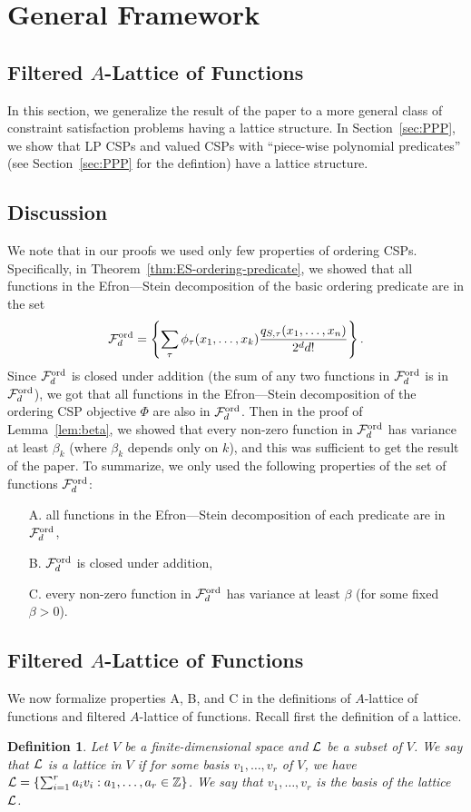 \documentclass[11pt]{article}
\newcommand {\set}   [1] {\left\{ #1 \right\}}
\newcommand {\bbZ}    {\mathbb{Z}}
\newcommand {\calF}   {{\cal{F}}}
\newcommand {\calL}   {{\cal{L}}}
\newtheorem{definition}[theorem]{Definition}
\begin{document}
\section{General Framework}\label{sec:general-framework}
\subsection{Filtered $A$-Lattice of Functions}
In this section, we generalize the result of the paper to a more general class of constraint satisfaction problems having a lattice structure. In Section~\ref{sec:PPP},
we show that LP CSPs and valued CSPs with ``piece-wise polynomial predicates'' (see Section~\ref{sec:PPP} for the defintion) have a lattice structure.

\subsection{Discussion}
We note that in our proofs we used only few properties of ordering CSPs. Specifically, in Theorem~\ref{thm:ES-ordering-predicate}, we showed that
all functions in the Efron---Stein decomposition of the basic ordering predicate are in the set
$$
\calF^{\mathrm{ord}}_{d} = \set{\sum_{\tau}\phi_{\tau}(x_1,\dots, x_k) \frac{q_{S,\tau}(x_1,\dots, x_n)}{2^{d} d!}}.
$$
Since $\calF^{\mathrm{ord}}_{d}$ is closed under addition (the sum of any two functions in $\calF^{\mathrm{ord}}_{d}$ is in $\calF^{\mathrm{ord}}_{d}$), we got that
all functions in the Efron---Stein decomposition of the ordering CSP objective $\Phi$ are also in $\calF^{\mathrm{ord}}_{d}$.
Then in the proof of  Lemma~\ref{lem:beta}, we showed that every non-zero function in $\calF^{\mathrm{ord}}_{d}$  has
variance at least $\beta_k$ (where $\beta_k$ depends only on $k$), and this was sufficient to get the result of the paper.
To summarize, we only used the following properties of the set of functions $\calF^{\mathrm{ord}}_{d}$:
\begin{itemize}
\item[A.] all functions in the Efron---Stein decomposition of each predicate are in $\calF^{\mathrm{ord}}_{d}$,
\item[B.] $\calF^{\mathrm{ord}}_{d}$ is closed under addition,
\item[C.] every non-zero function in $\calF^{\mathrm{ord}}_{d}$ has variance at least $\beta$ (for some fixed $\beta > 0$).
\end{itemize}
\subsection{Filtered $A$-Lattice of Functions}
We now formalize properties A, B, and C in the definitions of $A$-lattice of functions and filtered $A$-lattice of functions.
Recall first the definition of a lattice.
\begin{definition}
Let $V$ be a finite-dimensional space and $\calL$ be a subset of $V$. We say that $\calL$ is a lattice in $V$ if
for some basis $v_1,\dots, v_r$ of $V$, we have $\calL = \set{\sum_{i=1}^r a_i v_i:a_1,\dots, a_r \in \bbZ}$.
We say that $v_1,\dots, v_r$ is the basis of the lattice $\calL$.
\end{definition}
\end{document}
